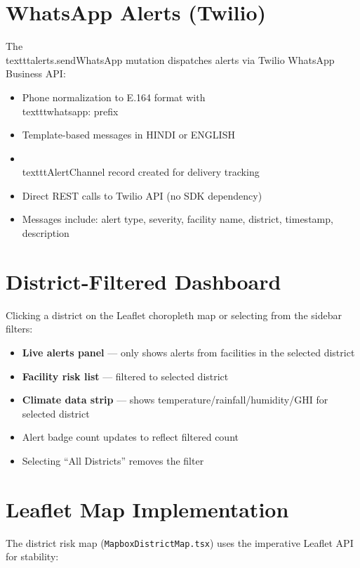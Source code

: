 \documentclass[12pt,a4paper]{report}
\begin{document}
\section{WhatsApp Alerts (Twilio)}

The \\texttt{alerts.sendWhatsApp} mutation dispatches alerts via Twilio WhatsApp Business API:

\begin{itemize}[nosep]
  \item Phone normalization to E.164 format with \\texttt{whatsapp:} prefix
  \item Template-based messages in HINDI or ENGLISH
  \item \\texttt{AlertChannel} record created for delivery tracking
  \item Direct REST calls to Twilio API (no SDK dependency)
  \item Messages include: alert type, severity, facility name, district, timestamp, description
\end{itemize}

\section{District-Filtered Dashboard}

Clicking a district on the Leaflet choropleth map or selecting from the sidebar filters:
\begin{itemize}[nosep]
  \item \textbf{Live alerts panel} --- only shows alerts from facilities in the selected district
  \item \textbf{Facility risk list} --- filtered to selected district
  \item \textbf{Climate data strip} --- shows temperature/rainfall/humidity/GHI for selected district
  \item Alert badge count updates to reflect filtered count
  \item Selecting ``All Districts'' removes the filter
\end{itemize}

\section{Leaflet Map Implementation}

The district risk map (\texttt{MapboxDistrictMap.tsx}) uses the imperative Leaflet API for stability:
\end{document}
